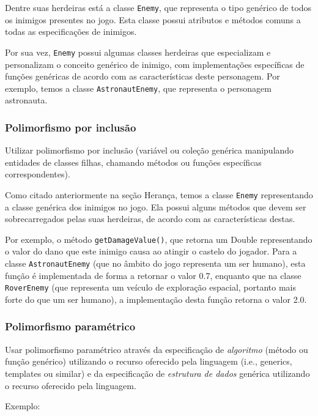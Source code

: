 \documentclass[rel_mlp]{iiufrgs}
\begin{document}
Dentre suas herdeiras está a classe \texttt{Enemy}, que representa o tipo genérico de todos os inimigos presentes no jogo. Esta classe possui atributos e métodos comuns a todas as especificações de inimigos.

Por sua vez, \texttt{Enemy} possui algumas classes herdeiras que especializam e personalizam o conceito genérico de inimigo, com implementações específicas de funções genéricas de acordo com as características deste personagem. Por exemplo, temos a classe \texttt{AstronautEnemy}, que representa o personagem astronauta.


\subsubsection{Polimorfismo por inclusão}

Utilizar polimorfismo por inclusão (variável ou coleção genérica manipulando entidades de classes filhas, chamando métodos ou funções específicas correspondentes).

Como citado anteriormente na seção Herança, temos a classe \texttt{Enemy} representando a classe genérica dos inimigos no jogo. Ela possui alguns métodos que devem ser sobrecarregados pelas suas herdeiras, de acordo com as características destas.

Por exemplo, o método \texttt{getDamageValue()}, que retorna um Double representando o valor do dano que este inimigo causa ao atingir o castelo do jogador. Para a classe \texttt{AstronautEnemy} (que no âmbito do jogo representa um ser humano), esta função é implementada de forma a retornar o valor 0.7, enquanto que na classe \texttt{RoverEnemy} (que representa um veículo de exploração espacial, portanto mais forte do que um ser humano), a implementação desta função retorna o valor 2.0.


\subsubsection{Polimorfismo paramétrico}

Usar polimorfismo paramétrico através da especificação de \textit{algoritmo} (método ou função genérico) utilizando o recurso oferecido pela linguagem (i.e., generics, templates ou similar) e da especificação de \textit{estrutura de dados} genérica utilizando o recurso oferecido pela linguagem.

Exemplo:
\end{document}
